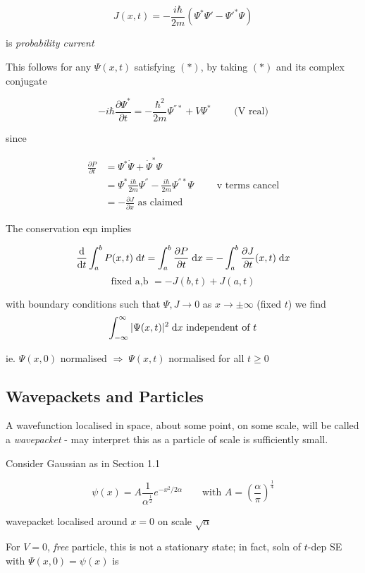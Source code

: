 \documentclass[a4paper]{article}
\begin{document}
\[ J(x,t) = - \frac{i \hbar}{2m}(\Psi^{*}\Psi' - \Psi'^{*} \Psi )  \]

is \emph{probability current}

This follows for any $ \Psi(x,t) $ satisfying $ (*) $, by taking $ (*) $ and its complex conjugate

\[ - i \hbar \frac{\partial \Psi^{*} }{\partial t} = -\frac{\hbar^{2}}{2m} \Psi^{'' *} + V \Psi^{*} \qquad \text{  (V real)}\]

since

\begin{align*}
\frac{\partial P }{\partial t}& = \Psi^{*} \dot{\Psi} + \dot{\Psi}^{*} \Psi \\
& = \Psi^{*} \frac{i \hbar}{2m} \Psi^{''} - \frac{i \hbar}{2m} \Psi^{'' *} \Psi \qquad \text{ v terms cancel} \\
& =  - \frac{\partial J }{\partial x} \text{ as claimed}
\end{align*}

The conservation eqn implies

\[ \frac{\mathrm{d} }{\mathrm{d} t} \int_{a}^{b} P(x,t) \; \mathrm{d} t = \int_{a}^{b} \frac{\partial P }{\partial t} \; \mathrm{d} x = - \int_{a}^{b} \frac{\partial J }{\partial t} (x,t) \; \mathrm{d} x \]
\[ \text{fixed a,b } = -J(b,t) + J(a,t) \]

with boundary conditions such that $ \Psi, J \to 0 $ as $ x \to \pm \infty $ (fixed $ t $) we find 
\[ \int_{-\infty}^{\infty} | \Psi(x,t) |^{2} \; \mathrm{d} x  \text{ independent of  } t \]

ie. $ \Psi(x,0) $ normalised $ \Rightarrow \; \Psi(x,t) $ normalised for all $ t \geq 0 $

\subsection{Wavepackets and Particles}

A wavefunction localised in space, about some point, on some scale, will be called a \emph{wavepacket} - may interpret this as a particle of scale is sufficiently small.

Consider Gaussian as in Section 1.1 %

\[ \psi(x) = A \frac{1}{\alpha^{\frac{1}{2}}} e^{-x^{2}/2\alpha} \qquad \text{with  } A = \left( \frac{\alpha}{\pi} \right)^{\frac{1}{4}}  \]

wavepacket localised around $ x = 0 $ on scale $ \sqrt{\alpha} $


For $ V = 0 $, \emph{free} particle, this is not a stationary state; in fact, soln of $ t $-dep SE with $ \Psi(x,0) = \psi(x) $ is
\end{document}

